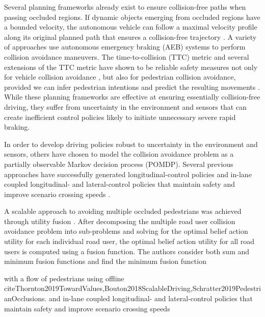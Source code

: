\documentclass[conference]{IEEEtran}
\begin{document}
Several planning frameworks already exist to ensure collision-free paths when passing occluded regions. If dynamic objects emerging from occluded regions have a bounded velocity, the autonomous vehicle can follow a maximal velocity profile along its original planned path that ensures a collision-free trajectory \cite{Alami2002OnPlans}. A variety of approaches use autonomous emergency braking (AEB) systems to perform collision avoidance maneuvers. The time-to-collision (TTC) metric and several extensions of the TTC metric have shown to be reliable safety measures not only for vehicle collision avoidance \cite{Minderhoud2001ExtendedAssessment}, but also for pedestrian collision avoidance, provided we can infer pedestrian intentions and predict the resulting movements \cite{Volz2019InferringCrosswalks}. While these planning frameworks are effective at ensuring essentially collision-free driving, they suffer from uncertainty in the environment and sensors that can create inefficient control policies likely to initiate unnecessary severe rapid braking.

In order to develop driving policies robust to uncertainty in the environment and sensors, others have chosen to model the collision avoidance problem as a partially observable Markov decision process (POMDP). Several previous approaches have successfully generated longitudinal-control policies and in-lane coupled longitudinal- and lateral-control policies that maintain safety and improve scenario crossing speeds \cite{Thornton2019TowardValues,Bouton2018ScalableDriving,Schratter2019PedestrianOcclusions}.

A scalable approach to avoiding multiple occluded pedestrians was achieved through utility fusion \cite{Bouton2018ScalableDriving}. After decomposing the multiple road user collision avoidance problem into sub-problems and solving for the optimal belief action utility for each individual road user, the optimal belief action utility for all road users is computed using a fusion function. The authors consider both sum and minimum fusion functions and find the minimum fusion function 

with a flow of pedestrians using offline  cite{Thornton2019TowardValues,Bouton2018ScalableDriving,Schratter2019PedestrianOcclusions}. and in-lane coupled longitudinal- and lateral-control policies that maintain safety and improve scenario crossing speeds
\end{document}
